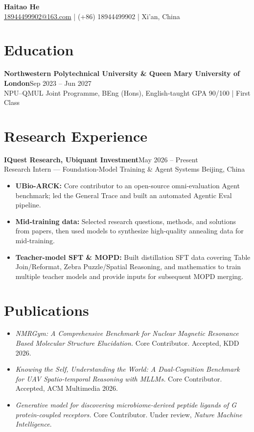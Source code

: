 \documentclass[9pt,a4paper]{article}
\newcommand{\entry}[3]{\textbf{#1}\hfill #2\\#3\par}
\begin{document}
\begin{center}
  {\Large\bfseries Haitao He}\\[1pt]
  \href{mailto:18944499902@163.com}{18944499902@163.com} \;|\; (+86) 18944499902 \;|\; Xi'an, China
\end{center}

\section{Education}
\entry{Northwestern Polytechnical University \& Queen Mary University of London}{Sep 2023 -- Jun 2027}{NPU--QMUL Joint Programme, BEng (Hons), English-taught \hfill GPA 90/100 \;|\; First Class}

\section{Research Experience}
\entry{IQuest Research, Ubiquant Investment}{May 2026 -- Present}{Research Intern --- Foundation-Model Training \& Agent Systems \hfill Beijing, China}
\begin{itemize}
  \item \textbf{UBio-ARCK:} Core contributor to an open-source omni-evaluation Agent benchmark; led the General Trace and built an automated Agentic Eval pipeline.
  \item \textbf{Mid-training data:} Selected research questions, methods, and solutions from papers, then used models to synthesize high-quality annealing data for mid-training.
  \item \textbf{Teacher-model SFT \& MOPD:} Built distillation SFT data covering Table Join/Reformat, Zebra Puzzle/Spatial Reasoning, and mathematics to train multiple teacher models and provide inputs for subsequent MOPD merging.
\end{itemize}

\section{Publications}
\begin{itemize}
  \item \textit{NMRGym: A Comprehensive Benchmark for Nuclear Magnetic Resonance Based Molecular Structure Elucidation.} Core Contributor. Accepted, KDD 2026.
  \item \textit{Knowing the Self, Understanding the World: A Dual-Cognition Benchmark for UAV Spatio-temporal Reasoning with MLLMs.} Core Contributor. Accepted, ACM Multimedia 2026.
  \item \textit{Generative model for discovering microbiome-derived peptide ligands of G protein-coupled receptors.} Core Contributor. Under review, \textit{Nature Machine Intelligence}.
\end{itemize}
\end{document}

